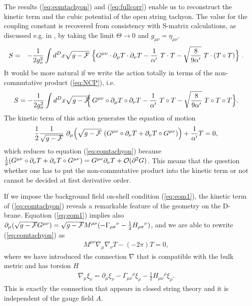 \documentclass[a4paper,11pt]{article}               \def\new#1\endnew{{\bf #1}}
\newcommand {\cF} {{\cal F}}
\newcommand {\cO}{{\cal O}}
\newcommand {\Back}{\!\!\!\!\!}
\begin{document}
The results (\ref{eq:eomtachyon}) and (\ref{eq:fullcorr}) enable us to
reconstruct the kinetic term and the cubic potential of the open
string tachyon. The value for the coupling constant is recovered from 
consistency with S-matrix calculations, as discussed 
e.g. in \cite{Polchinski:1998rq}, by  
taking the limit $\Theta \rightarrow 0$ and $g_{\mu\nu} = \eta_{\mu\nu}$.
\begin{eqnarray}
  \label{eq:tachaction}
  S &=& - \frac 1{2g_o^2} \int d^Dx \sqrt{g-\cF}~
      \Bigl\{ 
      G^{\mu\nu} \cdot \partial_\mu T \cdot \partial_\nu T -
      \frac {1}{\alpha'} ~T \cdot T - 
      {\sqrt \frac{8}{9\alpha'}} ~T \cdot (T \circ T) \Bigr\}~.
\end{eqnarray}
It would be more natural if we write the action totally in
terms of the non-commutative product (\ref{eq:NCP}), i.e.
\begin{eqnarray}
  \label{eq:cubicaction}
  S = - \frac 1{2g_o^2} \int d^Dx \sqrt{g-\cF}~
      \Back&\Bigl\{&\Back 
      G^{\mu\nu} \circ \partial_\mu T \circ \partial_\nu T -
      \frac {1}{\alpha'} ~T \circ T - 
      {\sqrt \frac{8}{9\alpha'}} ~T\circ T\circ T \Bigr\}.
\end{eqnarray}
The kinetic term of this action generates the equation of motion
\begin{eqnarray}
  \label{eq:eomLagrang}
  \frac 12 \frac 1{\sqrt{g-\cF}}~
  \partial_\mu \Bigl( \sqrt{g-\cF}~(G^{\mu\nu} \circ \partial_\nu T +
  \partial_\nu T \circ G^{\mu\nu}) \Bigr) + \frac 1{\alpha'} T = 0,
\end{eqnarray}
which reduces to equation (\ref{eq:eomtachyon}) because
$\frac12(G^{\mu\nu} \circ \partial_\nu T + \partial_\nu T \circ G^{\mu\nu}) 
= G^{\mu\nu} \partial_\nu T + \cO(\partial^2G)$. 
This means that the question whether one has to put the non-commutative 
product into the kinetic term or not cannot be decided at %
first derivative order. 

If we impose the background field on-shell condition (\ref{eq:eom1}),
the kinetic term of (\ref{eq:eomtachyon}) reveals a remarkable feature
of the geometry on the D-brane. Equation (\ref{eq:eom1}) implies also
$\partial_\mu (\sqrt{g-\cF}G^{\mu\nu}) = \sqrt{g-\cF} M^{\rho\sigma} (-\Gamma_{\rho\sigma}{}^{\nu} - \frac 12 H_{\rho\sigma}{}^{\nu})$,
and we are able to rewrite (\ref{eq:eomtachyon}) as
\begin{eqnarray}
  \label{eq:eomtachyon2}
  M^{\mu\nu}\nabla_\mu \nabla_\nu T - (-2\pi) T = 0,
\end{eqnarray}
where we have introduced the connection $\nabla$ that is compatible
with the bulk metric and has torsion $H$
\begin{eqnarray}
  \label{eq:connection}
  \nabla_\mu \xi_\nu = \partial_\mu \xi_\nu
                      - \Gamma_{\mu\nu}{}^\rho \xi_\rho
                      - \frac 12 H_{\mu\nu}{}^\rho \xi_\rho .
\end{eqnarray}
This is exactly the connection that appears in closed string theory
and it is independent of the gauge field $A$.
\end{document}

